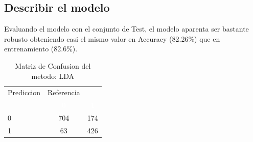 \documentclass[]{article}
\begin{document}
\hypertarget{describir-el-modelo-3}{%
\subsection{Describir el modelo}\label{describir-el-modelo-3}}

Evaluando el modelo con el conjunto de Test, el modelo aparenta ser
bastante robusto obteniendo casi el mismo valor en Accuracy (82.26\%)
que en entrenamiento (82.6\%).

\begin{table}[!h]

\caption{\label{tab:MatrizConf_LDA}Matriz de Confusion del metodo: LDA }
\centering
\begin{tabular}[t]{lcc}
\toprule
\multicolumn{1}{c}{Prediccion} & \multicolumn{1}{c}{Referencia} & \multicolumn{1}{c}{ } \\
\cmidrule(l{3pt}r{3pt}){1-1} \cmidrule(l{3pt}r{3pt}){2-2}
\rowcolor{black}  \multicolumn{1}{c}{\textcolor{white}{\textbf{ }}} & \multicolumn{1}{c}{\textcolor{white}{\textbf{0}}} & \multicolumn{1}{c}{\textcolor{white}{\textbf{1}}}\\
\midrule
\rowcolor{gray!6}  0 & 704 & 174\\
1 & 63 & 426\\
\bottomrule
\end{tabular}
\end{table}
\end{document}
